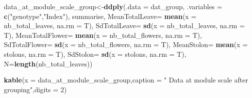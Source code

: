\documentclass[]{article}
\newenvironment{Shaded}{\begin{snugshade}}{\end{snugshade}}
\newcommand{\KeywordTok}[1]{\textcolor[rgb]{0.13,0.29,0.53}{\textbf{#1}}}
\newcommand{\DataTypeTok}[1]{\textcolor[rgb]{0.13,0.29,0.53}{#1}}
\newcommand{\DecValTok}[1]{\textcolor[rgb]{0.00,0.00,0.81}{#1}}
\newcommand{\StringTok}[1]{\textcolor[rgb]{0.31,0.60,0.02}{#1}}
\newcommand{\NormalTok}[1]{#1}
\begin{document}
\begin{Shaded}
\begin{Highlighting}[]
\NormalTok{data_at_module_scale_group<-}\KeywordTok{ddply}\NormalTok{(}\DataTypeTok{.data =}\NormalTok{ dat_group,}
                                  \DataTypeTok{.variables =} \KeywordTok{c}\NormalTok{(}\StringTok{"genotype"}\NormalTok{,}\StringTok{"Index"}\NormalTok{),}
\NormalTok{                                  summarise,}
                                  \DataTypeTok{MeanTotalLeave=} \KeywordTok{mean}\NormalTok{(}\DataTypeTok{x =}\NormalTok{ nb_total_leaves,}
                                                       \DataTypeTok{na.rm =}\NormalTok{ T),}
                                  \DataTypeTok{SdTotalLeave=} \KeywordTok{sd}\NormalTok{(}\DataTypeTok{x =}\NormalTok{ nb_total_leaves,}
                                                   \DataTypeTok{na.rm =}\NormalTok{ T),}
                                  \DataTypeTok{MeanTotalFlower=} \KeywordTok{mean}\NormalTok{(}\DataTypeTok{x =}\NormalTok{ nb_total_flowers,}
                                                        \DataTypeTok{na.rm =}\NormalTok{ T),}
                                  \DataTypeTok{SdTotalFlower=} \KeywordTok{sd}\NormalTok{(}\DataTypeTok{x =}\NormalTok{ nb_total_flowers,}
                                                    \DataTypeTok{na.rm =}\NormalTok{ T),}
                                  \DataTypeTok{MeanStolon=} \KeywordTok{mean}\NormalTok{(}\DataTypeTok{x =}\NormalTok{ stolons,}
                                                   \DataTypeTok{na.rm =}\NormalTok{ T),}
                                  \DataTypeTok{SdStolon=} \KeywordTok{sd}\NormalTok{(}\DataTypeTok{x =}\NormalTok{ stolons,}
                                               \DataTypeTok{na.rm =}\NormalTok{ T),}
                            \DataTypeTok{N=}\KeywordTok{length}\NormalTok{(nb_total_leaves))}

\KeywordTok{kable}\NormalTok{(}\DataTypeTok{x =}\NormalTok{ data_at_module_scale_group,}\DataTypeTok{caption =} \StringTok{" Data at module scale after grouping"}\NormalTok{,}\DataTypeTok{digits =} \DecValTok{2}\NormalTok{)}
\end{Highlighting}
\end{Shaded}
\end{document}
